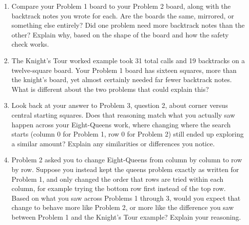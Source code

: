 \documentclass[11pt]{article}
\begin{document}
\begin{enumerate}[leftmargin=1.4em]
  \item Compare your Problem 1 board to your Problem 2 board, along with the
        backtrack notes you wrote for each. Are the boards the same,
        mirrored, or something else entirely? Did one problem need more
        backtrack notes than the other? Explain why, based on the shape of
        the board and how the safety check works.
  \item The Knight's Tour worked example took 31 total calls and 19
        backtracks on a twelve-square board. Your Problem 1 board has
        sixteen squares, more than the knight's board, yet almost certainly
        needed far fewer backtrack notes. What is different about the two
        problems that could explain this?
  \item Look back at your answer to Problem 3, question 2, about corner
        versus central starting squares. Does that reasoning match what you
        actually saw happen across your Eight-Queens work, where changing
        where the search starts (column 0 for Problem 1, row 0 for Problem
        2) still ended up exploring a similar amount? Explain any
        similarities or differences you notice.
  \item Problem 2 asked you to change Eight-Queens from column by column to
        row by row. Suppose you instead kept the queens problem exactly as
        written for Problem 1, and only changed the order that rows are
        tried within each column, for example trying the bottom row first
        instead of the top row. Based on what you saw across Problems 1
        through 3, would you expect that change to behave more like Problem
        2, or more like the difference you saw between Problem 1 and the
        Knight's Tour example? Explain your reasoning.
\end{enumerate}
\end{document}
